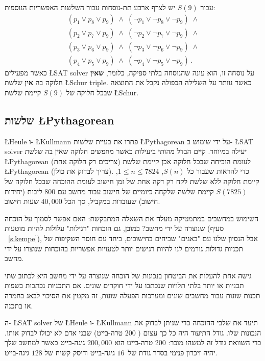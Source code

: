 עבור 
$S(9)$
יש לצרף ארבע תת-נוסחות עבור השלשות האפשריות הנוספות:
\[
\begin{array}{l}
(p_1 \vee p_8 \vee p_9) \;\wedge\; (\neg p_1 \vee \neg p_8 \vee \neg p_9) \;\wedge \\
(p_2 \vee p_7 \vee p_9) \;\wedge\; (\neg p_2 \vee \neg p_7 \vee \neg p_9) \;\wedge \\
(p_3 \vee p_6 \vee p_9) \;\wedge\; (\neg p_3 \vee \neg p_6 \vee \neg p_9) \;\wedge \\
(p_4 \vee p_5 \vee p_9) \;\wedge\; (\neg p_4 \vee \neg p_5 \vee \neg p_9)\,.
\end{array}
\]
כאשר מפעילים 
\L{SAT solver}
על נוסחה זו, הוא עונה שהנוסחה בלתי ספיקה, כלומר, 
\textbf{שאין}
חלוקה בה 
\textbf{אין }
שלשת
\L{Schur triple}. 
כאשר נוותר על השלילה הכפולה נקבל את התוצאה שבכל חלוקה של
$S(9)$
קיימת שלשת
\L{Schur}.

\subsection{שלשות \L{Pythagorean}}

\L{Heule}
ו-%
\L{Kullmann}
פתרו את בעיית שלשות
\L{Pythagorean}
על ידי שימוש ב-%
\L{SAT solver}
יעילה במיוחד. קיים הבדל מהותי ביעילות כאשר מחפשים חלוקה שאין בה שלשת
\L{Pythagorean}
(צריכים רק חלוקה אחת) לעומת הוכיחה שבכל חלוקה אכן קיימת שלשת
\L{Pythagorean}
(צריך לבדוק את כולן). כדי להראות שעבור כל
$S(n)$, $1\leq n\leq 7824$, 
קיימת חלוקה ללא שלשת לקח רק דקה אחת של זמן חישוב לעומת ההוכחה שבכל חלוקה של
$S(7825)$
קיימת שלשה שלקחה כיומיים של חישוב עבור מחשב עם
$800$
ליבות (יחידות חישוב) שעובדות במקביל, סך הכל 
$40,000$
שעות חישוב.

השימוש במחשבים במתמטיקה מעלה את השאלה המתבקשת: האם אפשר לסמוך על הוכחה שנוצרה על ידי מחשב? כמובן, גם הוכחות "רגילות" עלולות להיות מוטעות (סעיף%
~\ref{s.kempe}),
אבל הנסיון שלנו עם "באגים" שכיחים בחישובים, ביחד עם חוסר השקיפות של תכניות גדולות גורמים לנו להיות רגישים יותר לטעויות אפשריות בהוכחות שנוצרו על ידי מחשב.

גישה אחת להעלות את הביטחון בנכונות של הוכחה שנוצרה על ידי מחשב היא לכתוב שתי תכניות או יותר בלתי תלויות שנכתבו על ידי חוקרים שונים. אם התכניות נכתבות בשפות תכנות שונות עבור מחשבים שונים ומערכות הפעלה שונות, זה מקטין את הסיכוי לבאג בחמרה או בתכנה.

ה-%
\L{SAT solver}
של
\L{Heule}
ו-%
\L{Kullmann}
תיעד את שלבי ההוכחה כדי שניתן לבדוק את הנכונות שלו. גודל התיעוד היה כל כך עצום (%
$200$
טרה-בייט) שבני אדם לא יכולו לבדוק אותו. כדי השוואת גודל זה למשהו מוכר: 
$200$
טרה-בייט הוא 
$200,\!000$
גיגה-בייט כאשר למחשב שלך יהיה זיכרון פנימי בסדר גודת של\
$16$
גיגה-בייט ודיסק קשיח של
$128$
גיגה-בייט.

